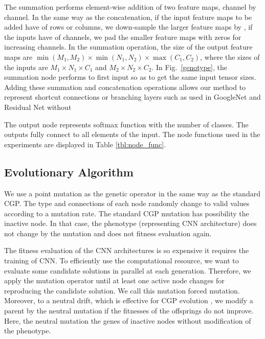 The summation performs  element-wise addition of two feature maps, channel by channel. 
In the same way as the concatenation, if the input feature maps to be added have   of rows or columns, we down-sample the larger feature maps by 
, if the inputs have   of channels, we pad the smaller feature maps with zeros for increasing channels.
In the summation operation, the size of the output feature maps are $\min (M_1, M_2) \times \min (N_1, N_2) \times \max (C_1, C_2)$, where the sizes of the inputs are $M_1 \times N_1 \times C_1$ and $M_2 \times N_2 \times C_2$. In Fig.~\ref{genotype}, the summation node performs  to  first input so as to get the same input tensor sizes. Adding these summation and concatenation operations allows our method to represent shortcut connections or branching layers\new{,} such as  used in GoogleNet \cite{szegedy_going_2015} and Residual Net \cite{he_deep_2016} without 

The output node represents  softmax function with the number of classes. The outputs fully connect to all elements of the input.
The node functions used in the experiments are displayed in Table \ref{tbl:node_func}.

\subsection{Evolutionary Algorithm}
We use a point mutation as the genetic operator in the same way as the standard CGP. The type and connections of each node randomly change to valid values according to a mutation rate. 
The standard CGP mutation has  possibility  the inactive node. In that case, the phenotype (representing  CNN architecture) does not change by the mutation and does not  fitness evaluation again.

The fitness evaluation of the CNN architectures is so expensive  it requires the training of CNN.
To efficiently use the computational resource, we want to evaluate some candidate solutions in parallel at each generation.
Therefore, we apply the mutation operator until at least one active node changes for reproducing the candidate solution. We call this mutation  forced mutation.
Moreover, to  a neutral drift, which is effective for CGP evolution \cite{miller_redundancy_2006,miller_cartesian_2000}, we modify a parent by the neutral mutation if the fitnesses of the offsprings do not improve.
Here, the neutral mutation   the genes of  inactive nodes without  modification of the phenotype.

